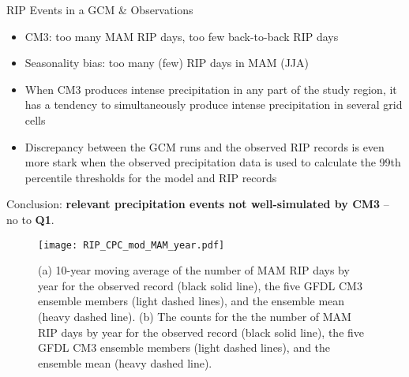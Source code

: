 \begin{block}{RIP Events in a GCM \& Observations}
  \begin{itemize}
    \item CM3: too many MAM RIP days, too few back-to-back RIP days
    \item Seasonality bias: too many (few) RIP days in MAM (JJA)
    \item When CM3 produces intense precipitation in any part of the study region, it has a tendency to simultaneously produce intense precipitation in several grid cells
    \item Discrepancy between the GCM runs and the observed RIP records is even more stark when the observed precipitation data is used to calculate the 99th percentile thresholds for the model and RIP records
  \end{itemize}
  Conclusion: \textbf{relevant precipitation events not well-simulated by CM3} -- no to \textbf{Q1}.
  \begin{figure}[ht]
    \centering
    \texttt{[image: RIP\_CPC\_mod\_MAM\_year.pdf]}
    \caption{
      (a) 10-year moving average of the number of MAM RIP days by year for the observed record (black solid line), the five GFDL CM3 ensemble members (light dashed lines), and the ensemble mean (heavy dashed line).
      (b) The counts for the the number of MAM RIP days by year for the observed record (black solid line), the five GFDL CM3 ensemble members (light dashed lines), and the ensemble mean (heavy dashed line).
    }
    \label{fig:RIP-historic}
  \end{figure}
\end{block}
